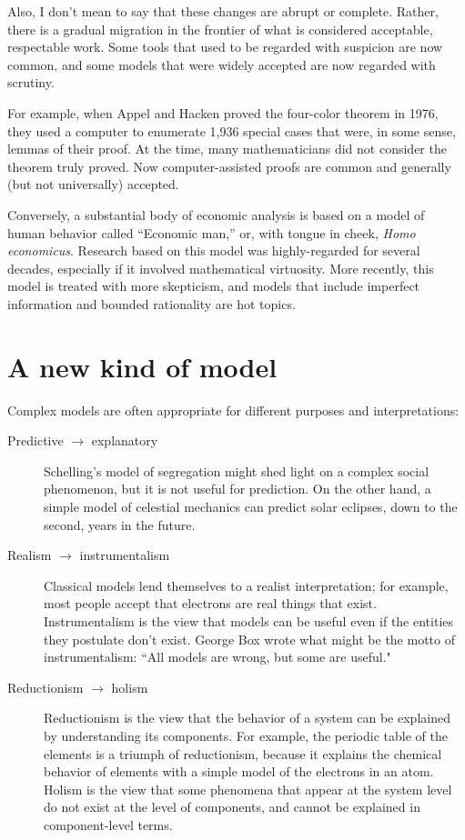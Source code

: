 \documentclass[10pt]{book}
\begin{document}
Also, I don't mean to say that these changes are abrupt or complete.
Rather, there is a gradual migration in the frontier of what is
considered acceptable, respectable work.  Some tools that used
to be regarded with suspicion are now common, and some 
models that were widely accepted are now regarded with scrutiny.

For example, when Appel and Hacken proved the four-color theorem in
1976, they used a computer to enumerate 1,936 special cases that were,
in some sense, lemmas of their proof.  At the time, many
mathematicians did not consider the theorem truly proved.  Now
computer-assisted proofs are common and generally (but not
universally) accepted.

Conversely, a substantial body of economic analysis is based on a
model of human behavior called ``Economic man,'' or, with tongue in
cheek, {\it Homo economicus}.  Research based on this model was
highly-regarded for several decades, especially if it involved
mathematical virtuosity.  More recently, this model is treated with
more skepticism, and models that include imperfect information and
bounded rationality are hot topics.


\section{A new kind of model}

Complex models are often appropriate for different purposes and
interpretations:

\begin{description}

\item[Predictive $\rightarrow$ explanatory] Schelling's model
of segregation might shed light on a complex social phenomenon, but
it is not useful for prediction.  On the other hand, a simple model
of celestial mechanics can predict solar eclipses, down to the second,
years in the future.

\item[Realism $\rightarrow$ instrumentalism] Classical models lend
  themselves to a realist interpretation; for example, most people
  accept that electrons are real things that exist.  Instrumentalism
  is the view that models can be useful even if the entities they
  postulate don't exist.  George Box wrote what might be the motto of
  instrumentalism: ``All models are wrong, but some are useful."

\item[Reductionism $\rightarrow$ holism] Reductionism is the view that
  the behavior of a system can be explained by understanding its
  components.  For example, the periodic table of the elements is a
  triumph of reductionism, because it explains the chemical behavior
  of elements with a simple model of the electrons in an atom.  Holism
  is the view that some phenomena that appear at the system level do
  not exist at the level of components, and cannot be explained in
  component-level terms.

\end{description}
\end{document}
